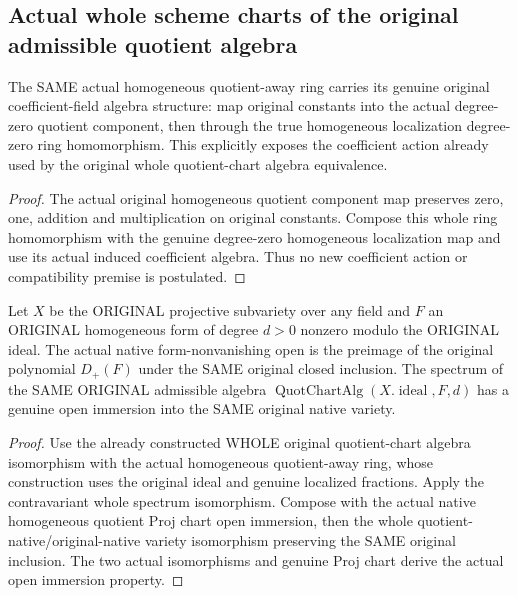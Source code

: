 \subsection{Actual whole scheme charts of the original admissible quotient algebra}

\begin{definition}
\label{projective:actual-native-quotient-away-coefficient-algebra}
\leanok
The SAME actual homogeneous quotient-away ring carries its genuine
original coefficient-field algebra structure: map original constants
into the actual degree-zero quotient component, then through the true
homogeneous localization degree-zero ring homomorphism. This explicitly
exposes the coefficient action already used by the original whole
quotient-chart algebra equivalence.
\end{definition}
\begin{proof}
The actual original homogeneous quotient component map preserves zero,
one, addition and multiplication on original constants. Compose this
whole ring homomorphism with the genuine degree-zero homogeneous
localization map and use its actual induced coefficient algebra. Thus no
new coefficient action or compatibility premise is postulated.
\end{proof}

\begin{definition}
\label{projective:actual-original-admissible-native-chart}
\leanok
{}
Let $X$ be the ORIGINAL projective subvariety over any field and $F$ an
ORIGINAL homogeneous form of degree $d>0$ nonzero modulo the ORIGINAL
ideal. The actual native form-nonvanishing open is the preimage of the
original polynomial $D_+(F)$ under the SAME original closed inclusion.
The spectrum of the SAME ORIGINAL admissible algebra
$\operatorname{QuotChartAlg}(X.\operatorname{ideal},F,d)$ has a genuine
open immersion into the SAME original native variety.
\end{definition}
\begin{proof}
Use the already constructed WHOLE original quotient-chart algebra
isomorphism with the actual homogeneous quotient-away ring, whose
construction uses the original ideal and genuine localized fractions.
Apply the contravariant whole spectrum isomorphism. Compose with the
actual native homogeneous quotient Proj chart open immersion, then the
whole quotient-native/original-native variety isomorphism preserving
the SAME original inclusion. The two actual isomorphisms and genuine
Proj chart derive the actual open immersion property.
\end{proof}

